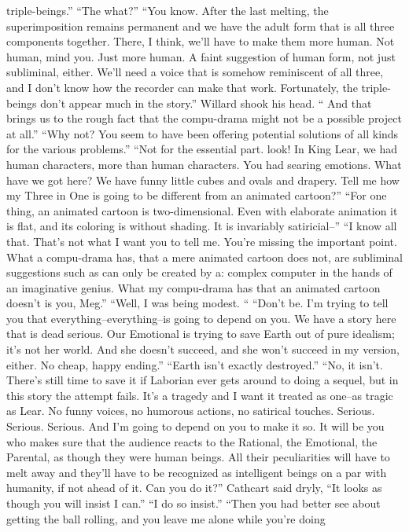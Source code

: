 \documentclass[a4paper,12pt]{article}
\begin{document}
triple-beings.”
“The what?”
“You know. After the last melting, the superimposition remains permanent and we have the adult
form that is all three components together. There, I think, we’ll have to make them more human. Not
human, mind you. Just more human. A faint suggestion of human form, not just subliminal, either. We’ll
need a voice that is somehow reminiscent of all three, and I don’t know how the recorder can make that
work. Fortunately, the triple-beings don’t appear much in the story.”
Willard shook his head. “ And that brings us to the rough fact that the compu-drama might not be
a possible project at all.”
“Why not? You seem to have been offering potential solutions of all kinds for the various
problems.”
“Not for the essential part. look! In King Lear, we had human characters, more than human
characters. You had searing emotions. What have we got here? We have funny little cubes and ovals and
drapery. Tell me how my Three in One is going to be different from an animated cartoon?”
“For one thing, an animated cartoon is two-dimensional. Even with elaborate animation it is flat,
and its coloring is without shading. It is invariably satiricial--”
“I know all that. That’s not what I want you to tell me. You’re missing the important point. What a
compu-drama has, that a mere animated cartoon does not, are subliminal suggestions such as can only be
created by a: complex computer in the hands of an imaginative genius. What my compu-drama has that an
animated cartoon doesn’t is you, Meg.”
“Well, I was being modest. “
“Don’t be. I’m trying to tell you that everything--everything--is going to depend on you. We have
a story here that is dead serious. Our Emotional is trying to save Earth out of pure idealism; it’s not her
world. And she doesn’t succeed, and she won’t succeed in my version, either. No cheap, happy ending.”
“Earth isn’t exactly destroyed.”
“No, it isn’t. There’s still time to save it if Laborian ever gets around to doing a sequel, but in this
story the attempt fails. It’s a tragedy and I want it treated as one--as tragic as Lear. No funny voices, no
humorous actions, no satirical touches. Serious. Serious. Serious. And I’m going to depend on you to make
it so. It will be you who makes sure that the audience reacts to the Rational, the Emotional, the Parental, as
though they were human beings. All their peculiarities will have to melt away and they’ll have to be
recognized as intelligent beings on a par with humanity, if not ahead of it. Can you do it?”
Cathcart said dryly, “It looks as though you will insist I can.”
“I do so insist.”
“Then you had better see about getting the ball rolling, and you leave me alone while you’re doing
\end{document}
